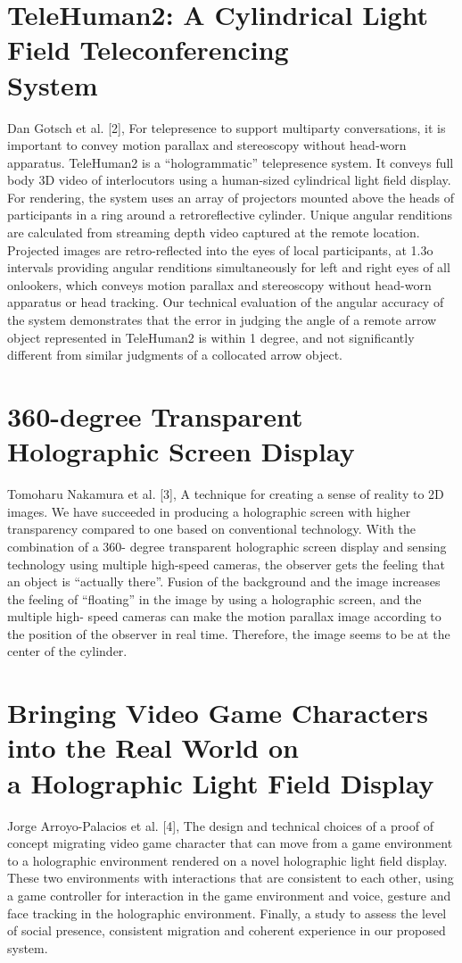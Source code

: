 \documentclass{fisatproject}
\begin{document}
\section{\normalsize TeleHuman2: A Cylindrical Light Field Teleconferencing \\ System }
\par Dan Gotsch et al. [2],  For telepresence to support multiparty conversations, it is important to convey motion parallax and stereoscopy without head-worn apparatus. TeleHuman2 is a “hologrammatic” telepresence system. It conveys full body 3D video of interlocutors using a human-sized cylindrical light field display. For rendering, the system uses an array of projectors mounted above the heads of participants in a ring around a retroreflective cylinder. Unique angular renditions are calculated from streaming depth video captured at the remote location. Projected images are retro-reflected into the eyes of local participants, at 1.3o intervals providing angular renditions simultaneously for left and right eyes of all onlookers, which conveys motion parallax and stereoscopy without head-worn apparatus or head tracking. Our technical evaluation of the angular accuracy of the system demonstrates that the error in judging the angle of a remote arrow object represented in TeleHuman2 is within 1 degree, and not significantly different from similar judgments of a collocated arrow object.
\section{\normalsize 360-degree Transparent Holographic Screen Display}
\par Tomoharu Nakamura et al. [3], A technique for creating a sense of reality to 2D images. We have succeeded in producing a holographic screen with higher transparency compared to one based on conventional technology. With the combination of a 360- degree transparent holographic screen display and sensing technology using multiple high-speed cameras, the observer gets the feeling that an object is “actually there”. Fusion of the background and the image increases the feeling of “floating” in the image by using a holographic screen, and the multiple high- speed cameras can make the motion parallax image according to the position of the observer in real time. Therefore, the image seems to be at the center of the cylinder.
\section{\normalsize Bringing Video Game Characters into the Real World on \\ a Holographic Light Field Display}
\par Jorge Arroyo-Palacios et al. [4],   The design and technical choices of a proof of concept migrating video game character that can move from a game environment to a holographic environment rendered on a novel holographic light field display.  These two environments with interactions that are consistent to each other, using a game controller for interaction in the game environment and voice, gesture and face tracking in the holographic environment. Finally,  a study to assess the level of social presence, consistent migration and coherent experience in our proposed system.
\end{document}
